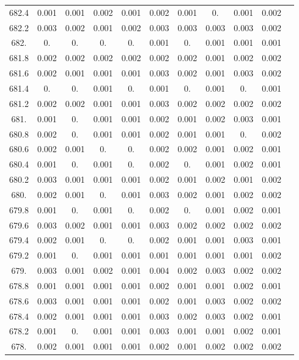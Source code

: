 \documentclass[12pt]{ctexart}
\numberwithin{equation}{section}
\begin{document}
\begin{longtable}{ccccccccccc}
682.4	&	0.001	&	0.001	&	0.002	&	0.001	&	0.002	&	0.001	&	0.	&	0.001	&	0.002	\\
682.2	&	0.003	&	0.002	&	0.001	&	0.002	&	0.003	&	0.003	&	0.003	&	0.003	&	0.002	\\
682.	&	0.	&	0.	&	0.	&	0.	&	0.001	&	0.	&	0.001	&	0.001	&	0.001	\\
681.8	&	0.002	&	0.002	&	0.002	&	0.002	&	0.002	&	0.002	&	0.001	&	0.002	&	0.002	\\
681.6	&	0.002	&	0.001	&	0.001	&	0.001	&	0.003	&	0.002	&	0.001	&	0.003	&	0.002	\\
681.4	&	0.	&	0.	&	0.001	&	0.	&	0.001	&	0.	&	0.001	&	0.	&	0.001	\\
681.2	&	0.002	&	0.002	&	0.001	&	0.001	&	0.003	&	0.002	&	0.002	&	0.002	&	0.002	\\
681.	&	0.001	&	0.	&	0.001	&	0.001	&	0.002	&	0.001	&	0.002	&	0.003	&	0.001	\\
680.8	&	0.002	&	0.	&	0.001	&	0.001	&	0.002	&	0.001	&	0.001	&	0.	&	0.002	\\
680.6	&	0.002	&	0.001	&	0.	&	0.	&	0.002	&	0.002	&	0.001	&	0.002	&	0.001	\\
680.4	&	0.001	&	0.	&	0.001	&	0.	&	0.002	&	0.	&	0.001	&	0.002	&	0.001	\\
680.2	&	0.003	&	0.001	&	0.001	&	0.001	&	0.002	&	0.001	&	0.002	&	0.001	&	0.002	\\
680.	&	0.002	&	0.001	&	0.	&	0.001	&	0.003	&	0.002	&	0.001	&	0.002	&	0.002	\\
679.8	&	0.001	&	0.	&	0.001	&	0.	&	0.002	&	0.	&	0.001	&	0.002	&	0.001	\\
679.6	&	0.003	&	0.002	&	0.001	&	0.001	&	0.003	&	0.002	&	0.002	&	0.002	&	0.002	\\
679.4	&	0.002	&	0.001	&	0.	&	0.	&	0.002	&	0.001	&	0.001	&	0.003	&	0.001	\\
679.2	&	0.001	&	0.	&	0.001	&	0.001	&	0.001	&	0.001	&	0.001	&	0.001	&	0.002	\\
679.	&	0.003	&	0.001	&	0.002	&	0.001	&	0.004	&	0.002	&	0.003	&	0.002	&	0.002	\\
678.8	&	0.001	&	0.001	&	0.001	&	0.001	&	0.002	&	0.001	&	0.001	&	0.002	&	0.001	\\
678.6	&	0.003	&	0.001	&	0.001	&	0.001	&	0.002	&	0.001	&	0.003	&	0.002	&	0.002	\\
678.4	&	0.002	&	0.001	&	0.001	&	0.001	&	0.003	&	0.002	&	0.003	&	0.002	&	0.001	\\
678.2	&	0.001	&	0.	&	0.001	&	0.001	&	0.003	&	0.001	&	0.001	&	0.002	&	0.001	\\
678.	&	0.002	&	0.001	&	0.001	&	0.001	&	0.002	&	0.001	&	0.002	&	0.002	&	0.002	\\

\end{longtable}
\end{document}
